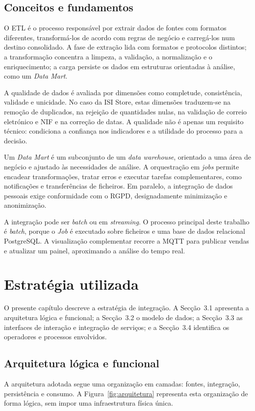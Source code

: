 \documentclass[11pt,a4paper]{article}
\begin{document}
\subsection{Conceitos e fundamentos}
O ETL é o processo responsável por extrair dados de fontes com formatos diferentes, transformá-los de acordo com regras de negócio e carregá-los num destino consolidado. A fase de extração lida com formatos e protocolos distintos; a transformação concentra a limpeza, a validação, a normalização e o enriquecimento; a carga persiste os dados em estruturas orientadas à análise, como um \textit{Data Mart}.

A qualidade de dados é avaliada por dimensões como completude, consistência, validade e unicidade. No caso da ISI Store, estas dimensões traduzem-se na remoção de duplicados, na rejeição de quantidades nulas, na validação de correio eletrónico e NIF e na correção de datas. A qualidade não é apenas um requisito técnico: condiciona a confiança nos indicadores e a utilidade do processo para a decisão.

Um \textit{Data Mart} é um subconjunto de um \textit{data warehouse}, orientado a uma área de negócio e ajustado às necessidades de análise. A orquestração em \textit{jobs} permite encadear transformações, tratar erros e executar tarefas complementares, como notificações e transferências de ficheiros. Em paralelo, a integração de dados pessoais exige conformidade com o RGPD, designadamente minimização e anonimização.

A integração pode ser \textit{batch} ou em \textit{streaming}. O processo principal deste trabalho é \textit{batch}, porque o \textit{Job} é executado sobre ficheiros e uma base de dados relacional PostgreSQL. A visualização complementar recorre a MQTT para publicar vendas e atualizar um painel, aproximando a análise do tempo real.

\section{Estratégia utilizada}
O presente capítulo descreve a estratégia de integração. A Secção~3.1 apresenta a arquitetura lógica e funcional; a Secção~3.2 o modelo de dados; a Secção~3.3 as interfaces de interação e integração de serviços; e a Secção~3.4 identifica os operadores e processos envolvidos.

\subsection{Arquitetura lógica e funcional}
A arquitetura adotada segue uma organização em camadas: fontes, integração, persistência e consumo. A Figura~\ref{fig:arquitetura} representa esta organização de forma lógica, sem impor uma infraestrutura física única.
\end{document}
